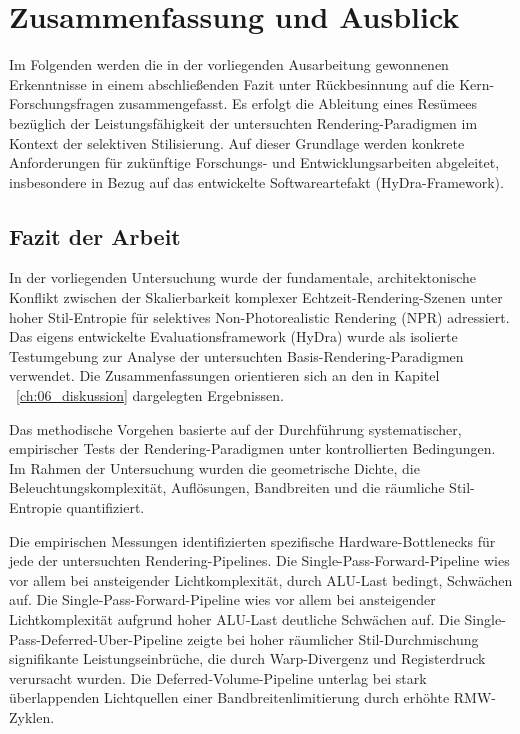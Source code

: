 \chapter{Zusammenfassung und Ausblick}
\label{ch:07_zusammenfassung_ausblick}

Im Folgenden werden die in der vorliegenden Ausarbeitung gewonnenen Erkenntnisse in einem abschließenden Fazit unter
Rückbesinnung auf die Kern-Forschungsfragen zusammengefasst.
Es erfolgt die Ableitung eines Resümees bezüglich der Leistungsfähigkeit der untersuchten Rendering-Paradigmen im
Kontext der selektiven Stilisierung.
Auf dieser Grundlage werden konkrete Anforderungen für zukünftige Forschungs- und Entwicklungsarbeiten abgeleitet,
insbesondere in Bezug auf das entwickelte Softwareartefakt (\ac{HyDra}-Framework).


\section{Fazit der Arbeit}
\label{sec:0701_conclusion}

In der vorliegenden Untersuchung wurde der fundamentale, architektonische Konflikt zwischen der Skalierbarkeit komplexer
Echtzeit-Rendering-Szenen unter hoher Stil-Entropie für selektives Non-Photorealistic Rendering (\ac{NPR}) adressiert.
Das eigens entwickelte Evaluationsframework (\ac{HyDra}) wurde als isolierte Testumgebung zur Analyse der
untersuchten Basis-Rendering-Paradigmen verwendet.
Die Zusammenfassungen orientieren sich an den in Kapitel ~\ref{ch:06_diskussion} dargelegten Ergebnissen.

Das methodische Vorgehen basierte auf der Durchführung systematischer, empirischer Tests der Rendering-Paradigmen unter
kontrollierten Bedingungen.
Im Rahmen der Untersuchung wurden die geometrische Dichte, die Beleuchtungskomplexität, Auflösungen, Bandbreiten und
die räumliche Stil-Entropie quantifiziert.

Die empirischen Messungen identifizierten spezifische Hardware-Bottlenecks für jede der untersuchten
Rendering-Pipelines.
Die Single-Pass-Forward-Pipeline wies vor allem bei ansteigender Lichtkomplexität, durch \ac{ALU}-Last bedingt,
Schwächen auf.
Die Single-Pass-Forward-Pipeline wies vor allem bei ansteigender Lichtkomplexität aufgrund hoher \ac{ALU}-Last
deutliche Schwächen auf.
Die Single-Pass-Deferred-Uber-Pipeline zeigte bei hoher räumlicher Stil-Durchmischung signifikante Leistungseinbrüche,
die durch Warp-Divergenz und Registerdruck verursacht wurden.
Die Deferred-Volume-Pipeline unterlag bei stark überlappenden Lichtquellen einer Bandbreitenlimitierung durch erhöhte
\ac{RMW}-Zyklen.

